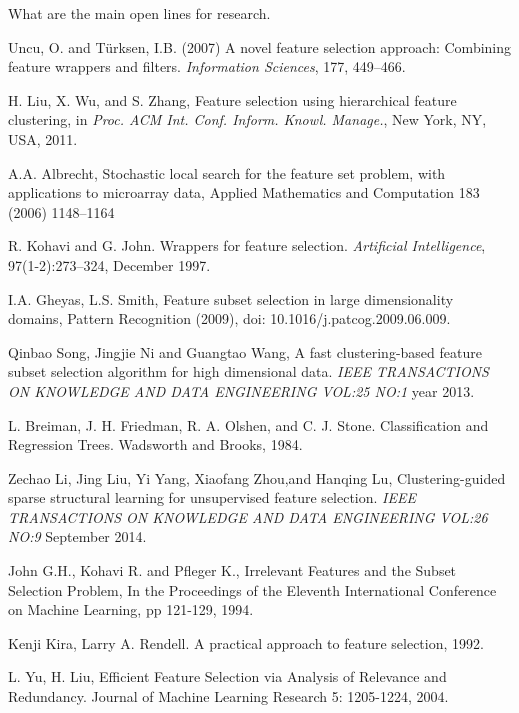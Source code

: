 \documentclass[a4paper,11pt]{article}
\begin{document}
What are the main open lines for research.




\begin{thebibliography}{}

Uncu, O. and T\"urksen, I.B. (2007) A novel feature selection
approach: Combining feature wrappers and filters. \textit{Information Sciences}, 177, 449--466.

H. Liu, X. Wu, and S. Zhang, Feature selection using hierarchical feature clustering, in \textit{Proc. ACM Int. Conf. Inform. Knowl. Manage.}, New York, NY, USA, 2011.

A.A. Albrecht, Stochastic local search for the feature set problem, with applications to microarray data, Applied Mathematics and Computation 183 (2006) 1148–1164

R. Kohavi and G. John. Wrappers for feature selection. \textit{Artificial Intelligence}, 97(1-2):273–324,
December 1997.

I.A. Gheyas, L.S. Smith, Feature subset selection in large dimensionality domains, Pattern Recognition (2009), doi:
10.1016/j.patcog.2009.06.009.

Qinbao Song, Jingjie Ni and Guangtao Wang, A fast clustering-based feature subset selection algorithm for high dimensional data. \textit{IEEE TRANSACTIONS ON KNOWLEDGE AND DATA ENGINEERING VOL:25 NO:1} year 2013.

L. Breiman, J. H. Friedman, R. A. Olshen, and C. J. Stone. Classification and Regression Trees. Wadsworth and Brooks, 1984.

Zechao Li, Jing Liu, Yi Yang, Xiaofang Zhou,and Hanqing Lu, Clustering-guided sparse structural learning
for unsupervised feature selection. \textit{IEEE TRANSACTIONS ON KNOWLEDGE AND DATA ENGINEERING VOL:26 NO:9} September 2014.

John G.H., Kohavi R. and Pfleger K., Irrelevant Features and the Subset Selection Problem, In the Proceedings of the Eleventh International Conference on Machine Learning, pp 121-129, 1994.

Kenji Kira, Larry A. Rendell. A practical approach to feature selection, 1992.

L. Yu, H. Liu, Efficient Feature Selection via Analysis
of Relevance and Redundancy. Journal of Machine
Learning Research 5: 1205-1224, 2004.

\end{thebibliography}
\end{document}
